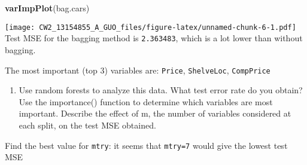 \documentclass[]{article}
\newenvironment{Shaded}{\begin{snugshade}}{\end{snugshade}}
\newcommand{\KeywordTok}[1]{\textcolor[rgb]{0.13,0.29,0.53}{\textbf{#1}}}
\newcommand{\DataTypeTok}[1]{\textcolor[rgb]{0.13,0.29,0.53}{#1}}
\newcommand{\DecValTok}[1]{\textcolor[rgb]{0.00,0.00,0.81}{#1}}
\newcommand{\StringTok}[1]{\textcolor[rgb]{0.31,0.60,0.02}{#1}}
\newcommand{\OtherTok}[1]{\textcolor[rgb]{0.56,0.35,0.01}{#1}}
\newcommand{\ControlFlowTok}[1]{\textcolor[rgb]{0.13,0.29,0.53}{\textbf{#1}}}
\newcommand{\OperatorTok}[1]{\textcolor[rgb]{0.81,0.36,0.00}{\textbf{#1}}}
\newcommand{\NormalTok}[1]{#1}
\providecommand{\tightlist}{%
  \setlength{\itemsep}{0pt}\setlength{\parskip}{0pt}}
\begin{document}
\begin{Shaded}
\begin{Highlighting}[]
\KeywordTok{varImpPlot}\NormalTok{(bag.cars)}
\end{Highlighting}
\end{Shaded}

\texttt{[image: CW2\_13154855\_A\_GUO\_files/figure-latex/unnamed-chunk-6-1.pdf]}
Test MSE for the bagging method is \texttt{2.363483}, which is a lot
lower than without bagging.

The most important (top 3) variables are: \texttt{Price},
\texttt{ShelveLoc}, \texttt{CompPrice}

\begin{enumerate}
\def\labelenumi{(\alph{enumi})}
\setcounter{enumi}{4}
\tightlist
\item
  Use random forests to analyze this data. What test error rate do you
  obtain? Use the importance() function to determine which variables are
  most important. Describe the effect of m, the number of variables
  considered at each split, on the test MSE obtained.
\end{enumerate}

Find the best value for \texttt{mtry}: it seems that \texttt{mtry=7}
would give the lowest test MSE

\begin{Shaded}
\end{Shaded}
\end{document}
